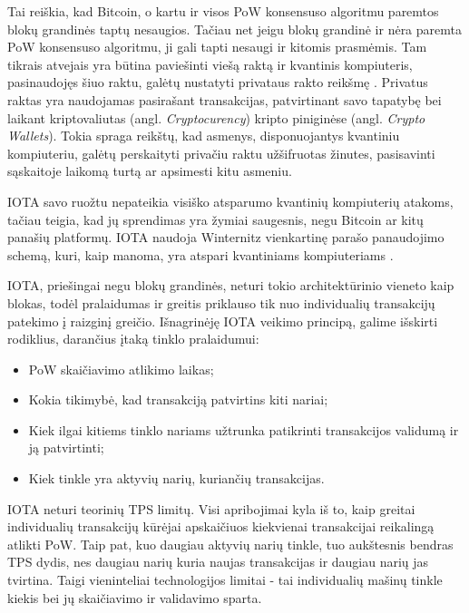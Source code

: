 Tai reiškia, kad Bitcoin, o kartu ir visos PoW konsensuso algoritmu paremtos blokų grandinės taptų nesaugios. Tačiau net jeigu blokų grandinė ir nėra paremta PoW konsensuso algoritmu, ji gali tapti nesaugi ir kitomis prasmėmis. Tam tikrais atvejais yra būtina paviešinti viešą raktą ir kvantinis kompiuteris, pasinaudojęs šiuo raktu, galėtų nustatyti privataus rakto reikšmę \cite{aggarwal2017quantum}. Privatus raktas yra naudojamas pasirašant transakcijas, patvirtinant savo tapatybę bei laikant kriptovaliutas (angl. \textit{Cryptocurency}) kripto piniginėse (angl. \textit{Crypto Wallets}). Tokia spraga reikštų, kad asmenys, disponuojantys kvantiniu kompiuteriu, galėtų perskaityti privačiu raktu užšifruotas žinutes, pasisavinti sąskaitoje laikomą turtą ar apsimesti kitu asmeniu.

IOTA savo ruožtu nepateikia visiško atsparumo kvantinių kompiuterių atakoms, tačiau teigia, kad jų sprendimas yra žymiai saugesnis, negu Bitcoin ar kitų panašių platformų. IOTA naudoja Winternitz vienkartinę parašo panaudojimo schemą, kuri, kaip manoma, yra atspari kvantiniams kompiuteriams \cite{el2018review}.





IOTA, priešingai negu blokų grandinės, neturi tokio architektūrinio vieneto kaip blokas, todėl pralaidumas ir greitis priklauso tik nuo individualių transakcijų patekimo į raizginį greičio. Išnagrinėję IOTA veikimo principą, galime išskirti rodiklius, darančius įtaką tinklo pralaidumui:
\begin{itemize}
    \item PoW skaičiavimo atlikimo laikas;
    \item Kokia tikimybė, kad transakciją patvirtins kiti nariai;
    \item Kiek ilgai kitiems tinklo nariams užtrunka patikrinti transakcijos validumą ir ją patvirtinti;
    \item Kiek tinkle yra aktyvių narių, kuriančių transakcijas.
\end{itemize}

IOTA neturi teorinių TPS limitų. Visi apribojimai kyla iš to, kaip greitai individualių transakcijų kūrėjai apskaičiuos kiekvienai transakcijai reikalingą atlikti PoW. Taip pat, kuo daugiau aktyvių narių tinkle, tuo aukštesnis bendras TPS dydis, nes daugiau narių kuria naujas transakcijas ir daugiau narių jas tvirtina. Taigi vieninteliai technologijos limitai - tai individualių mašinų tinkle kiekis bei jų skaičiavimo ir validavimo sparta.

